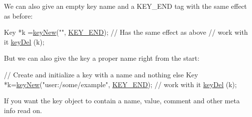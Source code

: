 We can also give an empty key name and a K\+E\+Y\+\_\+\+E\+ND tag with the same effect as before\+:


\begin{DoxyCodeInclude}
Key *k =\hyperlink{group__key_gad23c65b44bf48d773759e1f9a4d43b89}{keyNew}(\textcolor{stringliteral}{""}, \hyperlink{group__key_gga9b703ca49f48b482def322b77d3e6bc8aa8adb6fcb92dec58fb19410eacfdd403}{KEY\_END}); \textcolor{comment}{// Has the same effect as above}
\textcolor{comment}{// work with it}
\hyperlink{group__key_ga3df95bbc2494e3e6703ece5639be5bb1}{keyDel} (k);
\end{DoxyCodeInclude}
 But we can also give the key a proper name right from the start\+:


\begin{DoxyCodeInclude}
\textcolor{comment}{// Create and initialize a key with a name and nothing else}
Key *k=\hyperlink{group__key_gad23c65b44bf48d773759e1f9a4d43b89}{keyNew}(\textcolor{stringliteral}{"user:/some/example"}, \hyperlink{group__key_gga9b703ca49f48b482def322b77d3e6bc8aa8adb6fcb92dec58fb19410eacfdd403}{KEY\_END});
\textcolor{comment}{// work with it}
\hyperlink{group__key_ga3df95bbc2494e3e6703ece5639be5bb1}{keyDel} (k);
\end{DoxyCodeInclude}
 If you want the key object to contain a name, value, comment and other meta info read on.

